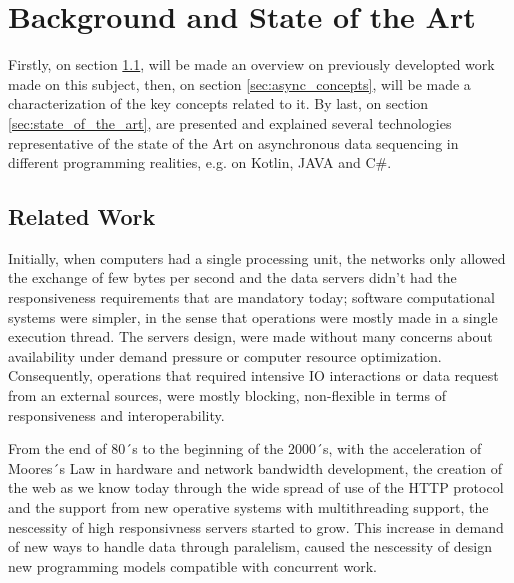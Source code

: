 % 
%  
%
\chapter{Background and State of the Art}
\label{cha:users_manual}

Firstly, on section \ref{sec:related_work}, will be made an overview on previously developted work made on this subject, then, on section \ref{sec:async_concepts}, will be made a characterization of the key concepts related to it. By last, on section \ref{sec:state_of_the_art}, are presented and explained several technologies representative of the state of the Art on asynchronous data sequencing in different programming realities, e.g. on Kotlin, JAVA and C\#. 


\section{Related Work} %
\label{sec:related_work}

Initially, when computers had a single processing unit, the networks only allowed the exchange of few bytes per second and the data servers didn't had the responsiveness requirements that are mandatory today; software computational systems were simpler, in the sense that operations were mostly made in a single execution thread. 
The servers design, were made without many concerns about availability under demand pressure or computer resource optimization. 
Consequently, operations that required intensive IO interactions or data request from an external sources, were mostly blocking, non-flexible in terms of responsiveness and interoperability. 

From the end of 80´s to the beginning of the 2000´s, with the acceleration of Moores´s Law in hardware and network bandwidth development, the creation of the web as we know today through the wide spread of use of the HTTP protocol and the support from new operative systems with multithreading support, the nescessity of high responsivness servers started to grow. This increase in demand of new ways to handle data through paralelism, caused the nescessity of design new programming models compatible with concurrent work. 

